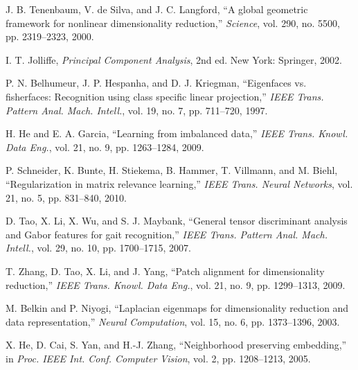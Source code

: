 \documentclass[review]{elsarticle}
\begin{document}
\begin{thebibliography}{50}
J. B. Tenenbaum, V. de Silva, and J. C. Langford, ``A global geometric framework for nonlinear dimensionality reduction,'' \emph{Science}, vol. 290, no. 5500, pp. 2319--2323, 2000.

I. T. Jolliffe, \emph{Principal Component Analysis}, 2nd ed. New York: Springer, 2002.

P. N. Belhumeur, J. P. Hespanha, and D. J. Kriegman, ``Eigenfaces vs. fisherfaces: Recognition using class specific linear projection,'' \emph{IEEE Trans. Pattern Anal. Mach. Intell.}, vol. 19, no. 7, pp. 711--720, 1997.

H. He and E. A. Garcia, ``Learning from imbalanced data,'' \emph{IEEE Trans. Knowl. Data Eng.}, vol. 21, no. 9, pp. 1263--1284, 2009.

P. Schneider, K. Bunte, H. Stiekema, B. Hammer, T. Villmann, and M. Biehl, ``Regularization in matrix relevance learning,'' \emph{IEEE Trans. Neural Networks}, vol. 21, no. 5, pp. 831--840, 2010.

D. Tao, X. Li, X. Wu, and S. J. Maybank, ``General tensor discriminant analysis and Gabor features for gait recognition,'' \emph{IEEE Trans. Pattern Anal. Mach. Intell.}, vol. 29, no. 10, pp. 1700--1715, 2007.

T. Zhang, D. Tao, X. Li, and J. Yang, ``Patch alignment for dimensionality reduction,'' \emph{IEEE Trans. Knowl. Data Eng.}, vol. 21, no. 9, pp. 1299--1313, 2009.

M. Belkin and P. Niyogi, ``Laplacian eigenmaps for dimensionality reduction and data representation,'' \emph{Neural Computation}, vol. 15, no. 6, pp. 1373--1396, 2003.

X. He, D. Cai, S. Yan, and H.-J. Zhang, ``Neighborhood preserving embedding,'' in \emph{Proc. IEEE Int. Conf. Computer Vision}, vol. 2, pp. 1208--1213, 2005.

\end{thebibliography}
\end{document}
